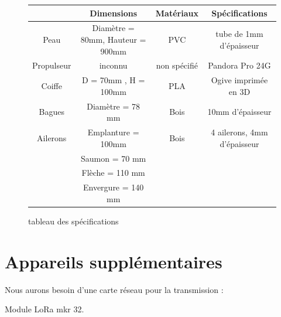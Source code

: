 \documentclass[48pt]{article}
\begin{document}
\begin{figure}[h]
		\begin{center}
		\begin{tabular}{|c|c|c|c|}
	  	\hline
			& Dimensions & Matériaux & Spécifications \\
 	 	\hline
			Peau & Diamètre = 80mm, Hauteur = 900mm & PVC & tube de 1mm d'épaisseur \\
		  \hline
			Propulseur & inconnu & non spécifié & Pandora Pro 24G \\
	 	 \hline
			Coiffe & D = 70mm , H = 100mm & PLA & Ogive imprimée en 3D \\
		  \hline
			Bagues & Diamètre = 78 mm & Bois & 10mm d'épaisseur \\
 		 \hline
			Ailerons & Emplanture = 100mm & Bois & 4 ailerons, 4mm d'épaisseur \\
 				
			& Saumon = 70 mm & & \\
			& Flèche = 110 mm & & \\
			& Envergure = 140 mm & & \\
			
		\hline
		\end{tabular}
	\end{center}

	\caption{tableau des spécifications}
\end{figure}

\vspace{2\baselineskip}

\section{\centering \Large Appareils supplémentaires}

Nous aurons besoin d'une carte réseau pour la transmission : 

\centering Module LoRa mkr 32.
\end{document}
